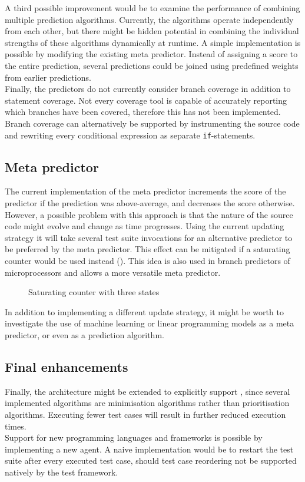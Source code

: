 \noindent A third possible improvement would be to examine the performance of combining multiple prediction algorithms. Currently, the algorithms operate independently from each other, but there might be hidden potential in combining the individual strengths of these algorithms dynamically at runtime. A simple implementation is possible by modifying the existing meta predictor. Instead of assigning a score to the entire prediction, several predictions could be joined using predefined weights from earlier predictions.\\

\noindent Finally, the predictors do not currently consider branch coverage in addition to statement coverage. Not every coverage tool is capable of accurately reporting which branches have been covered, therefore this has not been implemented. Branch coverage can alternatively be supported by instrumenting the source code and rewriting every conditional expression as separate \texttt{if}-statements.

\subsection{Meta predictor}
The current implementation of the meta predictor increments the score of the predictor if the prediction was above-average, and decreases the score otherwise. However, a possible problem with this approach is that the nature of the source code might evolve and change as time progresses. Using the current updating strategy it will take several test suite invocations for an alternative predictor to be preferred by the meta predictor. This effect can be mitigated if a saturating counter would be used instead (). This idea is also used in branch predictors of microprocessors and allows a more versatile meta predictor.

\begin{figure}[htbp!]
	\centering
	
	\caption{Saturating counter with three states}
	\label{fig:saturating-counter}
\end{figure}

\noindent In addition to implementing a different update strategy, it might be worth to investigate the use of machine learning or linear programming models as a meta predictor, or even as a prediction algorithm.

\subsection{Final enhancements}
Finally, the architecture might be extended to explicitly support \tsm{}, since several implemented algorithms are minimisation algorithms rather than prioritisation algorithms. Executing fewer test cases will result in further reduced execution times.\\

\noindent Support for new programming languages and frameworks is possible by implementing a new agent. A naive implementation would be to restart the test suite after every executed test case, should test case reordering not be supported natively by the test framework.